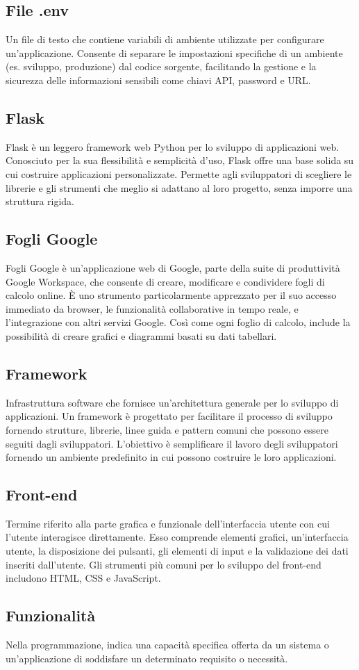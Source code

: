 \hypertarget{sec:file-.env}{}
\subsection*{File .env}
Un file di testo che contiene variabili di ambiente utilizzate per configurare un'applicazione. Consente di separare le impostazioni 
specifiche di un ambiente (es. sviluppo, produzione) dal codice sorgente, facilitando la gestione e la sicurezza delle informazioni 
sensibili come chiavi API, password e URL.

\hypertarget{sec:flask}{}
\subsection*{Flask}
Flask è un leggero framework web Python per lo sviluppo di applicazioni web. Conosciuto per la sua flessibilità e semplicità d'uso, 
Flask offre una base solida su cui costruire applicazioni personalizzate. Permette agli sviluppatori di scegliere le librerie e gli 
strumenti che meglio si adattano al loro progetto, senza imporre una struttura rigida.

\subsection*{Fogli Google}
Fogli Google è un'applicazione web di Google, parte della suite di produttività Google Workspace, che consente di creare, modificare e condividere fogli 
di calcolo online. È uno strumento particolarmente apprezzato per il suo accesso immediato da browser, le funzionalità collaborative in tempo reale, e 
l'integrazione con altri servizi Google. Così come ogni foglio di calcolo, include la possibilità di creare grafici e diagrammi basati su dati tabellari.

\hypertarget{sec:framework}{}
\subsection*{Framework}
Infrastruttura software che fornisce un’architettura generale per lo sviluppo di applicazioni. Un framework è progettato per facilitare il processo di 
sviluppo fornendo strutture, librerie, linee guida e pattern comuni che possono essere seguiti dagli sviluppatori. L’obiettivo è semplificare il lavoro 
degli sviluppatori fornendo un ambiente predefinito in cui possono costruire le loro applicazioni.

\hypertarget{sec:front-end}{}
\subsection*{Front-end}
Termine riferito alla parte grafica e funzionale dell’interfaccia utente con cui l’utente interagisce direttamente. 
Esso comprende elementi grafici, un’interfaccia utente, la disposizione dei pulsanti, gli elementi di input e la 
validazione dei dati inseriti dall’utente. Gli strumenti più comuni per lo sviluppo del front-end includono HTML, 
CSS e JavaScript.

\hypertarget{sec:funzionalità}{}
\subsection*{Funzionalità}
Nella programmazione, indica una capacità specifica offerta da un sistema o un'applicazione di soddisfare un determinato requisito o necessità.

\newpage